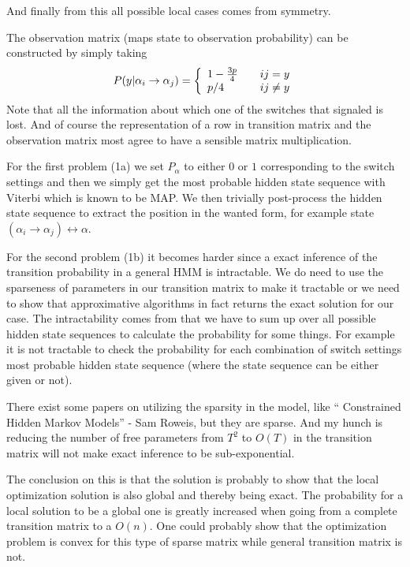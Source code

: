 \documentclass[a4paper,twoside=false,abstract=false,numbers=noenddot,
titlepage=false,headings=small,parskip=half,version=last]{scrartcl}
\begin{document}
\begin{solution}
    And finally from this all possible local cases comes from symmetry.

    The observation matrix (maps state to observation probability) 
    can be constructed by simply taking
    \begin{equation}
        P(y|\alpha_i\rightarrow\alpha_j) = \left\{
              \begin{array}{l l}
                      1-\frac{3p}{4} & \quad ij=y\\
                                 p/4 & \quad ij\neq y 
                    \end{array} \right.
    \end{equation}
    Note that all the information about which one of the switches that signaled
    is lost. And of course the representation of a row in transition matrix and 
    the observation matrix most agree to have a sensible matrix multiplication.

    For the first problem (1a) we set $P_\alpha$ to either $0$ or $1$
    corresponding to the switch settings and then we simply get the most
    probable hidden state sequence with Viterbi which is known to be MAP. 
    We then trivially post-process the hidden 
    state sequence to extract the position in the wanted form, for example
    state $(\alpha_i\rightarrow\alpha_j)\leftrightarrow \alpha$.

    For the second problem (1b) it becomes harder since a exact inference of
    the transition probability in a general HMM is intractable. We do need to
    use the sparseness of parameters in our transition matrix to make it
    tractable or we need to show that approximative algorithms in fact returns
    the exact solution for our case. The
    intractability comes from that we have to sum up over all possible hidden
    state sequences to calculate the probability for some things. For example
    it is not tractable to check the probability for each combination of switch
    settings most probable hidden state sequence (where the state sequence can
    be either given or not).

    There exist some papers on utilizing the sparsity in the model, like
    `` Constrained Hidden Markov Models'' - Sam Roweis, but they are sparse.
    And my hunch is reducing the number of free parameters from $T^2$ to $O(T)$
    in the transition matrix will not make exact inference to be
    sub-exponential.

    The conclusion on this is that the solution is probably to show that the
    local optimization solution is also global and thereby being exact. The
    probability for a local  solution to be a global one is greatly increased
    when going from a complete transition matrix to a $O(n)$. One could
    probably show that the optimization problem is convex for this type of
    sparse matrix while general transition matrix is not.


\end{solution}
\end{document}
